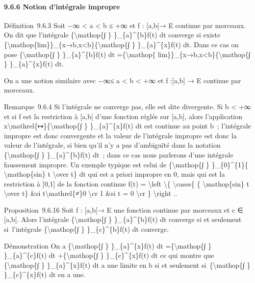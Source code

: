\documentclass[]{article}
\begin{document}
\paragraph{9.6.6 Notion d'intégrale impropre}

Définition~9.6.3 Soit −∞ \textless{} a \textless{} b ≤ +∞ et f :
{[}a,b{[}→ E continue par morceaux. On dit que l'intégrale
\{\textbackslash{}mathop\{∫ \} \}\_\{a\}\^{}\{b\}f(t) dt converge si
existe
\{\textbackslash{}mathop\{lim\}\}\_\{x→b,x\textless{}b\}\{\textbackslash{}mathop\{∫
\} \}\_\{a\}\^{}\{x\}f(t) dt. Dans ce cas on pose
\{\textbackslash{}mathop\{∫ \} \}\_\{a\}\^{}\{b\}f(t) dt
=\{\textbackslash{}mathop\{
lim\}\}\_\{x→b,x\textless{}b\}\{\textbackslash{}mathop\{∫ \}
\}\_\{a\}\^{}\{x\}f(t) dt.

On a une notion similaire avec −∞≤ a \textless{} b \textless{} +∞ et f
:{]}a,b{]} → E continue par morceaux.

Remarque~9.6.4 Si l'intégrale ne converge pas, elle est dite divergente.
Si b \textless{} +∞ et si f est la restriction à {[}a,b{[} d'une
fonction réglée sur {[}a,b{]}, alors l'application
x\textbackslash{}mathrel\{↦\}\{\textbackslash{}mathop\{∫ \}
\}\_\{a\}\^{}\{x\}f(t) dt est continue au point b~; l'intégrale impropre
est donc convergente et la valeur de l'intégrale impropre est donc la
valeur de l'intégrale, si bien qu'il n'y a pas d'ambiguïté dans la
notation \{\textbackslash{}mathop\{∫ \} \}\_\{a\}\^{}\{b\}f(t) dt~; dans
ce cas nous parlerons d'une intégrale faussement impropre. Un exemple
typique est celui de \{\textbackslash{}mathop\{∫ \} \}\_\{0\}\^{}\{1\}\{
\textbackslash{}mathop\{sin\} t \textbackslash{}over t\} dt qui est a
priori impropre en 0, mais qui est la restriction à {]}0,1{]} de la
fonction continue f(t) = \textbackslash{}left \textbackslash{}\{
\textbackslash{}cases\{ \{ \textbackslash{}mathop\{sin\} t
\textbackslash{}over t\} \&si t\textbackslash{}mathrel\{≠\}0
\textbackslash{}cr 1 \&si t = 0 \textbackslash{}cr \}
\textbackslash{}right ..

Proposition~9.6.16 Soit f : {[}a,b{[}→ E une fonction continue par
morceaux et c ∈ {[}a,b{[}. Alors l'intégrale \{\textbackslash{}mathop\{∫
\} \}\_\{a\}\^{}\{b\}f(t) dt converge si et seulement si~l'intégrale
\{\textbackslash{}mathop\{∫ \} \}\_\{c\}\^{}\{b\}f(t) dt converge.

Démonstration On a \{\textbackslash{}mathop\{∫ \} \}\_\{a\}\^{}\{x\}f(t)
dt =\{\textbackslash{}mathop\{∫ \} \}\_\{a\}\^{}\{c\}f(t) dt
+\{\textbackslash{}mathop\{∫ \} \}\_\{c\}\^{}\{x\}f(t) dt ce qui montre
que \{\textbackslash{}mathop\{∫ \} \}\_\{a\}\^{}\{x\}f(t) dt a une
limite en b si et seulement si~\{\textbackslash{}mathop\{∫ \}
\}\_\{c\}\^{}\{x\}f(t) dt en a une.
\end{document}
